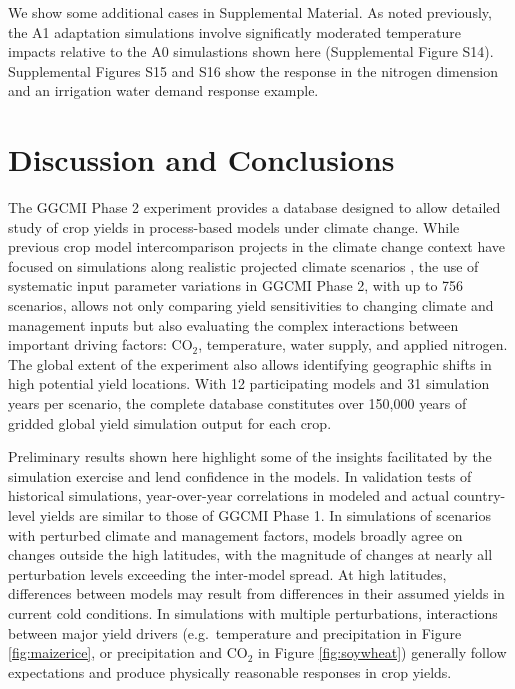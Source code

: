 \documentclass[gmd, manuscript]{copernicus} %
\begin{document}
We show some additional cases in Supplemental Material. As noted previously, the A1 adaptation simulations involve significatly moderated temperature impacts relative to the A0 simulastions shown here (Supplemental Figure S14).  
Supplemental Figures S15 and S16 show the response in the nitrogen dimension and an irrigation water demand response example.

\section{Discussion and Conclusions} 
\label{S:5}
The GGCMI Phase 2 experiment provides a database designed to allow detailed study of crop yields in process-based models under climate change. 
While previous crop model intercomparison projects in the climate change context have focused on simulations along realistic projected climate scenarios \citep[e.g.][]{Rosenzweig2014}, the use of systematic input parameter variations in GGCMI Phase 2, with up to 756 scenarios, allows not only comparing yield sensitivities to changing climate and management inputs but also evaluating the complex interactions between important driving factors: CO$_2$, temperature, water supply, and applied nitrogen. 
The global extent of the experiment also allows identifying geographic shifts in high potential yield locations. 
With 12 participating models and 31 simulation years per scenario, the complete database constitutes over 150,000 years of gridded global yield simulation output for each crop.

Preliminary results shown here highlight some of the insights facilitated by the simulation exercise and lend confidence in the models. 
In validation tests of historical simulations, year-over-year correlations in modeled and actual country-level yields are similar to those of GGCMI Phase 1. 
In simulations of scenarios with perturbed climate and management factors, models broadly agree on changes outside the high latitudes, with the magnitude of changes at nearly all perturbation levels exceeding the inter-model spread. At high latitudes, differences between models may result from differences in their assumed yields in current cold conditions. 
In simulations with multiple perturbations, interactions between major yield drivers (e.g.\ temperature and precipitation in Figure \ref{fig:maizerice}, or precipitation and CO$_2$ in Figure \ref{fig:soywheat}) generally follow expectations and produce physically reasonable responses in crop yields.
\end{document}
